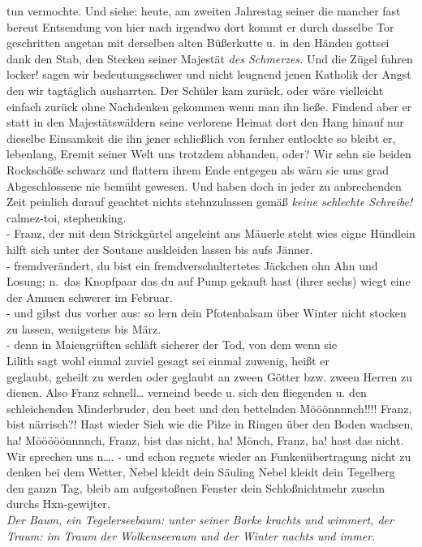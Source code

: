 \documentclass[
]{article}
\begin{document}
tun vermochte. Und siehe: heute, am zweiten Jahrestag seiner die mancher
fast bereut Entsendung von hier nach irgendwo dort kommt er durch
dasselbe Tor geschritten angetan mit derselben alten Büßerkutte u. in
den Händen gottsei dank den Stab, den Stecken seiner Majestät \emph{des
Schmerzes.} Und die Zügel fuhren locker! sagen wir bedeutungsschwer und
nicht leugnend jenen Katholik der Angst den wir tagtäglich ausharrten.
Der Schüler kam zurück, oder wäre vielleicht einfach zurück ohne
Nachdenken gekommen wenn man ihn ließe. Findend aber er statt in den
Majestätswäldern seine verlorene Heimat dort den Hang hinauf nur
dieselbe Einsamkeit die ihn jener schließlich von fernher entlockte so
bleibt er, lebenlang, Eremit seiner Welt uns trotzdem abhanden, oder?
Wir sehn sie beiden Rockschöße schwarz und flattern ihrem Ende entgegen
als wärn sie ums grad Abgeschlossene nie bemüht gewesen. Und haben doch
in jeder zu anbrechenden Zeit peinlich darauf geachtet nichts
stehnzulassen gemäß \emph{keine schlechte Schreibe! }calmez-toi,
stephenking.\\
- Franz, der mit dem Strickgürtel angeleint ans Mäuerle steht wies eigne
Hündlein hilft sich unter der Soutane auskleiden lassen bis aufs
Jänner.\\
- fremdverändert, du bist ein fremdverschultertetes Jäckchen ohn Ahn und
Losung; n.~das Knopfpaar das du auf Pump gekauft hast (ihrer sechs)
wiegt eine der Ammen schwerer im Februar.\\
- und gibst dus vorher aus: so lern dein Pfotenbalsam über Winter nicht
stocken zu lassen, wenigstens bis März.\\
- denn in Maiengrüften schläft sicherer der Tod, von dem wenn sie\\
Lilith sagt wohl einmal zuviel gesagt sei einmal zuwenig, heißt er\\
geglaubt, geheilt zu werden oder geglaubt an zween Götter bzw. zween
Herren zu dienen. Also Franz schnell\ldots{} verneind beede u. sich den
fliegenden u. den schleichenden Minderbruder, den beet und den
bettelnden Mööönnnnch!!!! Franz, bist närrisch?! Hast wieder Sieh wie
die Pilze in Ringen über den Boden wachsen, ha! Mööööönnnnch, Franz,
bist das nicht, ha! Mönch, Franz, ha! hast das nicht. Wir sprechen uns
n\ldots. - und schon regnets wieder an Funkenübertragung nicht zu denken
bei dem Wetter, Nebel kleidt dein Säuling Nebel kleidt dein Tegelberg
den ganzn Tag, bleib am aufgestoßnen Fenster dein Schloßnichtmehr zusehn
durchs Hxn-gewijter.\\
\emph{Der Baum, ein Tegelerseebaum: unter seiner Borke krachts und
wimmert, der Traum: im Traum der Wolkenseeraum und der Winter nachts und
immer.}\\
\end{document}
